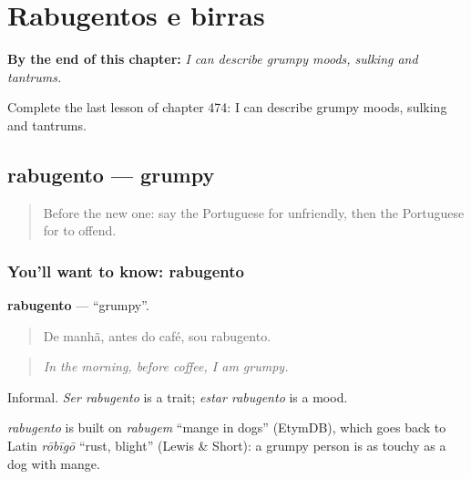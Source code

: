 
\chapter{Rabugentos e birras}
\label{ch:pt-rabugentos-e-birras}

\begin{chapteropening}
\textbf{By the end of this chapter:} \emph{I can describe grumpy moods, sulking and tantrums.}

Complete the last lesson of chapter 474: I can describe grumpy moods, sulking and tantrums.
\end{chapteropening}

\section[rabugento]{rabugento — grumpy}

\label{lesson:PT-C474-rabugento}



\begin{quote}
Before the new one: say the Portuguese for unfriendly, then the Portuguese for to offend.
\end{quote}

\subsection*{You'll want to know: rabugento}
\textbf{rabugento} — \textquotedblleft{}grumpy\textquotedblright{}.

\begin{quote}
De manhã, antes do café, sou rabugento.
\end{quote}

\begin{quote}
\emph{In the morning, before coffee, I am grumpy.}
\end{quote}

Informal. \emph{Ser rabugento} is a trait; \emph{estar rabugento} is a mood.

\begin{cousinweb}
\emph{rabugento} is built on \emph{rabugem} \textquotedblleft{}mange in dogs\textquotedblright{} (EtymDB), which goes back to Latin \emph{rōbīgō} \textquotedblleft{}rust, blight\textquotedblright{} (Lewis \& Short): a grumpy person is as touchy as a dog with mange.
\end{cousinweb}

